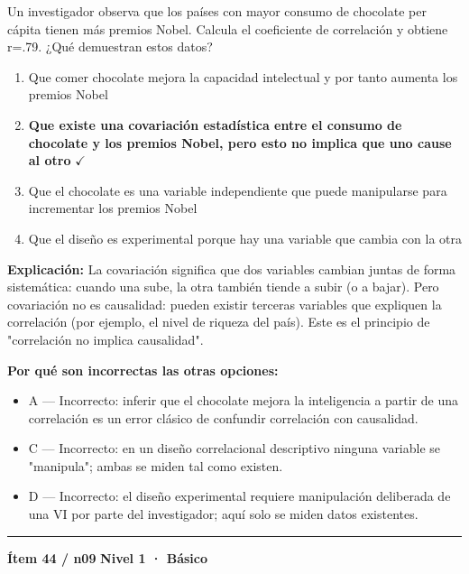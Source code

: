 \documentclass[12pt,a4paper]{article}
\begin{document}
Un investigador observa que los países con mayor consumo de chocolate per cápita tienen más premios Nobel. Calcula el coeficiente de correlación y obtiene r=.79. ¿Qué demuestran estos datos?

\begin{enumerate}
  \item[A.] Que comer chocolate mejora la capacidad intelectual y por tanto aumenta los premios Nobel
  \item[\textbf{\color{verde}B.}] \textbf{\color{verde} Que existe una covariación estadística entre el consumo de chocolate y los premios Nobel, pero esto no implica que uno cause al otro} \hfill $\checkmark$
  \item[C.] Que el chocolate es una variable independiente que puede manipularse para incrementar los premios Nobel
  \item[D.] Que el diseño es experimental porque hay una variable que cambia con la otra
\end{enumerate}

\noindent\textbf{\color{azul}Explicación:} La covariación significa que dos variables cambian juntas de forma sistemática: cuando una sube, la otra también tiende a subir (o a bajar). Pero covariación no es causalidad: pueden existir terceras variables que expliquen la correlación (por ejemplo, el nivel de riqueza del país). Este es el principio de "correlación no implica causalidad".

\noindent\textbf{\color{gris}Por qué son incorrectas las otras opciones:}
\begin{itemize}
  \item {\small A — Incorrecto: inferir que el chocolate mejora la inteligencia a partir de una correlación es un error clásico de confundir correlación con causalidad.}
  \item {\small C — Incorrecto: en un diseño correlacional descriptivo ninguna variable se "manipula"; ambas se miden tal como existen.}
  \item {\small D — Incorrecto: el diseño experimental requiere manipulación deliberada de una VI por parte del investigador; aquí solo se miden datos existentes.}
\end{itemize}
\vspace{8pt}\hrule\vspace{10pt}

\begin{mdframed}[backgroundcolor=fondogris,linecolor=azul,linewidth=1pt,innerleftmargin=10pt,innerrightmargin=10pt,innertopmargin=7pt,innerbottommargin=7pt]
\textbf{Ítem 44 / n09} \hfill {\small\bfseries\color{azul} Nivel 1 · Básico}
\end{mdframed}
\end{document}
